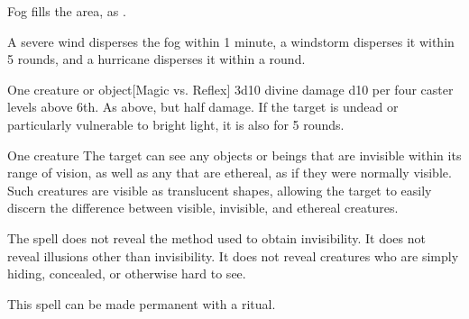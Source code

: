 \begin{spellheader}
\end{spellheader}
\begin{spelleffects}
    \spelleffect Fog fills the area, as .
\end{spelleffects}
\begin{spellfooter}
    \spellnotes \fogspellnotes A severe wind disperses the fog within 1 minute, a windstorm disperses it within 5 rounds, and a hurricane disperses it within a round.
\end{spellfooter}

\begin{spellheader}
    \spellrng{\rngclose}
\end{spellheader}
\begin{spelleffects}
    \begin{spelltarget}{One creature or object}[Magic vs. Reflex]
        \spellsuccess 3d10 divine damage \add d10 per four caster levels above 6th.
        \spellfailure As above, but half damage.
        \spelleffect If the target is undead or particularly vulnerable to bright light, it is also \dazzled for 5 rounds.
    \end{spelltarget}
\end{spelleffects}

\begin{spellheader}
    \spelldur{\durlong \dismissable}
\end{spellheader}
\begin{spelleffects}
    \begin{spelltarget}{One creature}
        \spelleffect The target can see any objects or beings that are invisible within its range of vision, as well as any that are ethereal, as if they were normally visible. Such creatures are visible as translucent shapes, allowing the target to easily discern the difference between visible, invisible, and ethereal creatures.
    \end{spelltarget}
\end{spelleffects}
\begin{spellfooter}
    \spellnotes The spell does not reveal the method used to obtain invisibility. It does not reveal illusions other than invisibility. It does not reveal creatures who are simply hiding, concealed, or otherwise hard to see.

    This spell can be made permanent with a  ritual.
\end{spellfooter}

